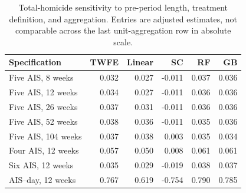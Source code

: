 \begin{longtable}{lrrrrr}
\caption{Total-homicide sensitivity to pre-period length, treatment definition, and aggregation. Entries are adjusted estimates, not comparable across the last unit-aggregation row in absolute scale.}\label{tab:sensitivityrebuild}\\
\toprule
Specification & TWFE & Linear & SC & RF & GB\\
\midrule
Five AIS, 8 weeks & 0.032 & 0.027 & -0.011 & 0.037 & 0.036\\
Five AIS, 12 weeks & 0.034 & 0.027 & -0.011 & 0.036 & 0.036\\
Five AIS, 26 weeks & 0.037 & 0.031 & -0.011 & 0.036 & 0.036\\
Five AIS, 52 weeks & 0.038 & 0.036 & -0.011 & 0.035 & 0.036\\
Five AIS, 104 weeks & 0.037 & 0.038 & 0.003 & 0.035 & 0.034\\
Four AIS, 12 weeks & 0.057 & 0.050 & 0.008 & 0.061 & 0.061\\
Six AIS, 12 weeks & 0.035 & 0.029 & -0.019 & 0.038 & 0.037\\
AIS--day, 12 weeks & 0.767 & 0.619 & -0.754 & 0.790 & 0.785\\
\bottomrule
\end{longtable}
